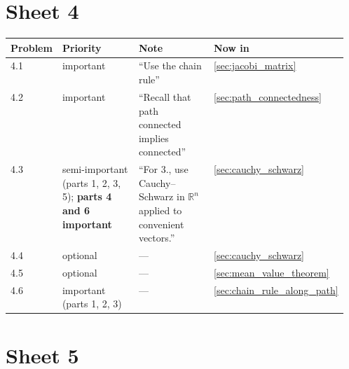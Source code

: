 \section{Sheet 4}
\label{sec:sheet_index_4}

\begin{center}
\begin{tabular}{@{}l p{0.28\linewidth} p{0.28\linewidth} l@{}}
\textbf{Problem} & \textbf{Priority} & \textbf{Note} & \textbf{Now in} \\
\hline
4.1 & important & ``Use the chain rule'' & \cref{sec:jacobi_matrix} \\[3pt]
4.2 & important & ``Recall that path connected implies connected'' & \cref{sec:path_connectedness} \\[3pt]
4.3 & semi-important (parts 1, 2, 3, 5); \textbf{parts 4 and 6 important} &
  ``For 3., use Cauchy--Schwarz in $\mathbb{R}^n$ applied to convenient vectors.'' &
  \cref{sec:cauchy_schwarz} \\[3pt]
4.4 & optional & --- & \cref{sec:cauchy_schwarz} \\[3pt]
4.5 & optional & --- & \cref{sec:mean_value_theorem} \\[3pt]
4.6 & important (parts 1, 2, 3) & --- & \cref{sec:chain_rule_along_path} \\
\end{tabular}
\end{center}


\section{Sheet 5}
\label{sec:sheet_index_5}

